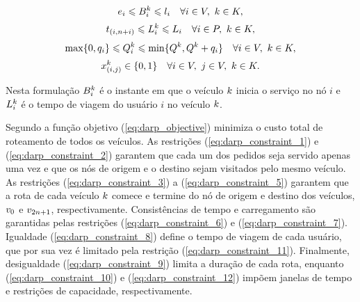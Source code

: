 %
\begin{equation} \label{eq:darp_constraint_10}
  e_i 
  \leqslant
  B^k_{i}
  \leqslant
  l_i
  \quad
  \forall i \in V,
  \ k \in K,
\end{equation}
%
\begin{equation} \label{eq:darp_constraint_11}
  t_{(i,n + i)}
  \leqslant
  L_i^{k}
  \leqslant
  L_i
  \quad
  \forall i \in P,
  \ k \in K,
\end{equation}
%
\begin{equation} \label{eq:darp_constraint_12}
  \max \{0, q_{i}\}
  \leqslant
  Q^{k}_i
  \leqslant
  \min \{Q^{k}, Q^{k} + q_{i}\}
  \quad
  \forall i \in V,
  \ k \in K,
\end{equation}
%
\begin{equation} \label{eq:darp_constraint_13}
  x_{(i, j)}^{k} \in \{0, 1\}
  \quad
  \forall i \in V,
  \ j \in V,
  \ k \in K.
\end{equation}

Nesta formulação $B_i^k$ é o instante em que o veículo $k$ inicia
o serviço no nó $i$ e $L^k_i$ é o tempo de viagem do usuário
$i$ no veículo $k$.

Segundo \textcite{cordeau_branch-and-cut_2006}
a função objetivo (\ref{eq:darp_objective})  minimiza o custo total de 
roteamento de todos os veículos. 
As restrições (\ref{eq:darp_constraint_1}) e (\ref{eq:darp_constraint_2}) 
garantem que cada um dos pedidos seja servido apenas uma vez e que os nós de 
origem e o destino sejam visitados pelo mesmo veículo.
As restrições (\ref{eq:darp_constraint_3}) a (\ref{eq:darp_constraint_5})
garantem que a rota de cada veículo $k$ comece e termine do nó de origem
e destino dos veículos, $v_{0}$ e $v_{2n + 1}$, respectivamente.
Consistências de tempo e carregamento são garantidas pelas restrições
(\ref{eq:darp_constraint_6}) e (\ref{eq:darp_constraint_7}).
Igualdade (\ref{eq:darp_constraint_8}) define o tempo de viagem de cada
usuário, que por sua vez é limitado pela restrição
(\ref{eq:darp_constraint_11}).
Finalmente, desigualdade (\ref{eq:darp_constraint_9}) limita a duração de cada
rota, enquanto (\ref{eq:darp_constraint_10}) e (\ref{eq:darp_constraint_12})
impõem janelas de tempo e restrições de capacidade, respectivamente.





